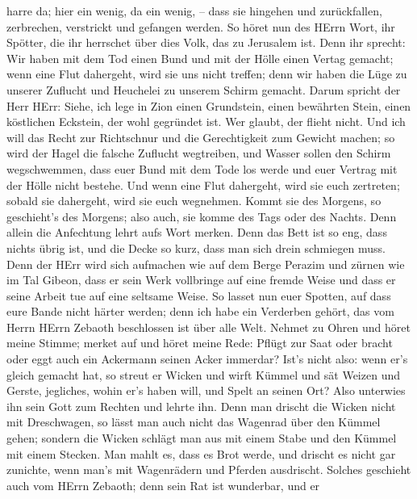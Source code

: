 harre da; hier ein wenig, da ein wenig, -- dass sie hingehen und
zurückfallen, zerbrechen, verstrickt und gefangen werden. 
So höret nun des HErrn Wort, ihr Spötter, die ihr herrschet über dies
Volk, das zu Jerusalem ist.  Denn ihr sprecht: Wir haben
mit dem Tod einen Bund und mit der Hölle einen Vertag gemacht; wenn eine
Flut dahergeht, wird sie uns nicht treffen; denn wir haben die Lüge zu
unserer Zuflucht und Heuchelei zu unserem Schirm gemacht. 
Darum spricht der Herr HErr: Siehe, ich lege in Zion einen Grundstein,
einen bewährten Stein, einen köstlichen Eckstein, der wohl gegründet
ist. Wer glaubt, der flieht nicht.  Und ich will das Recht
zur Richtschnur und die Gerechtigkeit zum Gewicht machen; so wird der
Hagel die falsche Zuflucht wegtreiben, und Wasser sollen den Schirm
wegschwemmen,  dass euer Bund mit dem Tode los werde und
euer Vertrag mit der Hölle nicht bestehe. Und wenn eine Flut dahergeht,
wird sie euch zertreten; sobald sie dahergeht, wird sie euch wegnehmen.
 Kommt sie des Morgens, so geschieht's des Morgens; also
auch, sie komme des Tags oder des Nachts. Denn allein die Anfechtung
lehrt aufs Wort merken.  Denn das Bett ist so eng, dass
nichts übrig ist, und die Decke so kurz, dass man sich drein schmiegen
muss.  Denn der HErr wird sich aufmachen wie auf dem Berge
Perazim und zürnen wie im Tal Gibeon, dass er sein Werk vollbringe auf
eine fremde Weise und dass er seine Arbeit tue auf eine seltsame Weise.
 So lasset nun euer Spotten, auf dass eure Bande nicht
härter werden; denn ich habe ein Verderben gehört, das vom Herrn HErrn
Zebaoth beschlossen ist über alle Welt.  Nehmet zu Ohren
und höret meine Stimme; merket auf und höret meine Rede: 
Pflügt zur Saat oder bracht oder eggt auch ein Ackermann seinen Acker
immerdar?  Ist's nicht also: wenn er's gleich gemacht hat,
so streut er Wicken und wirft Kümmel und sät Weizen und Gerste,
jegliches, wohin er's haben will, und Spelt an seinen Ort? 
Also unterwies ihn sein Gott zum Rechten und lehrte ihn. 
Denn man drischt die Wicken nicht mit Dreschwagen, so lässt man auch
nicht das Wagenrad über den Kümmel gehen; sondern die Wicken schlägt man
aus mit einem Stabe und den Kümmel mit einem Stecken.  Man
mahlt es, dass es Brot werde, und drischt es nicht gar zunichte, wenn
man's mit Wagenrädern und Pferden ausdrischt.  Solches
geschieht auch vom HErrn Zebaoth; denn sein Rat ist wunderbar, und er
